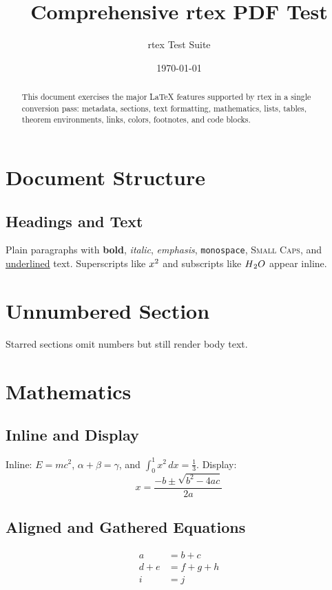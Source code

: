 \documentclass{article}
\title{Comprehensive rtex PDF Test}
\author{rtex Test Suite}
\date{\today}
\begin{document}
\maketitle

\begin{abstract}
This document exercises the major LaTeX features supported by rtex in a single
conversion pass: metadata, sections, text formatting, mathematics, lists, tables,
theorem environments, links, colors, footnotes, and code blocks.
\end{abstract}

\section{Document Structure}
\subsection{Headings and Text}
Plain paragraphs with \textbf{bold}, \textit{italic}, \emph{emphasis},
\texttt{monospace}, \textsc{Small Caps}, and \underline{underlined} text.
Superscripts like $x\textsuperscript{2}$ and subscripts like $H\textsubscript{2}O$
appear inline.

\section*{Unnumbered Section}
Starred sections omit numbers but still render body text.

\section{Mathematics}

\subsection{Inline and Display}
Inline: $E = mc^2$, $\alpha + \beta = \gamma$, and $\int_0^1 x^2\,dx = \tfrac{1}{3}$.
Display:
\begin{equation}
    x = \frac{-b \pm \sqrt{b^2 - 4ac}}{2a}
\end{equation}

\subsection{Aligned and Gathered Equations}
\begin{align}
    a &= b + c \\
    d + e &= f + g + h \\
    i &= j
\end{align}
\end{document}
